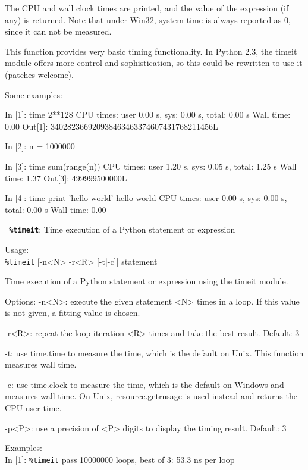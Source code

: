         The CPU and wall clock times are printed, and the value of the
        expression (if any) is returned.  Note that under Win32, system time
        is always reported as 0, since it can not be measured.

        This function provides very basic timing functionality.  In Python
        2.3, the timeit module offers more control and sophistication, so this
        could be rewritten to use it (patches welcome).
        
        Some examples:

          In [1]: time 2**128
          CPU times: user 0.00 s, sys: 0.00 s, total: 0.00 s
          Wall time: 0.00
          Out[1]: 340282366920938463463374607431768211456L

          In [2]: n = 1000000

          In [3]: time sum(range(n))
          CPU times: user 1.20 s, sys: 0.05 s, total: 1.25 s
          Wall time: 1.37
          Out[3]: 499999500000L

          In [4]: time print 'hello world'
          hello world
          CPU times: user 0.00 s, sys: 0.00 s, total: 0.00 s
          Wall time: 0.00
          

\bigskip
\texttt{\textbf{ \%timeit}}:
	Time execution of a Python statement or expression

        Usage:\\
          \texttt{\%timeit} [-n<N> -r<R> [-t|-c]] statement

        Time execution of a Python statement or expression using the timeit
        module.

        Options:
        -n<N>: execute the given statement <N> times in a loop. If this value
        is not given, a fitting value is chosen. 
        
        -r<R>: repeat the loop iteration <R> times and take the best result.
        Default: 3
        
        -t: use time.time to measure the time, which is the default on Unix.
        This function measures wall time.
        
        -c: use time.clock to measure the time, which is the default on
        Windows and measures wall time. On Unix, resource.getrusage is used
        instead and returns the CPU user time.

        -p<P>: use a precision of <P> digits to display the timing result.
        Default: 3

        
        Examples:\\
          In [1]: \texttt{\%timeit} pass
          10000000 loops, best of 3: 53.3 ns per loop

